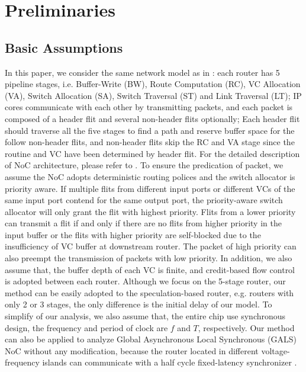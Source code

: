 \documentclass[10pt,journal]{IEEEtran}
\begin{document}
\section{Preliminaries}\label{model}
\subsection{Basic Assumptions}
In this paper, we consider the same network model as in \cite{627905}\cite{Shi:2008:RCA:1397757.1397996}\cite{707545}\cite{73}: each router has 5 pipeline stages, i.e. Buffer-Write (BW), Route Computation (RC), VC Allocation (VA), Switch Allocation (SA), Switch Traversal (ST) and Link Traversal (LT); IP cores communicate with each other by transmitting packets, and each packet is composed of a header flit and several non-header flits optionally; Each header flit should traverse all the five stages to find a path and reserve buffer space for the follow non-header flits, and non-header flits skip the RC and VA stage since the routine and VC have been determined by header flit. For the detailed description of NoC architecture, please refer to \cite{jerger2009chip}. To ensure the predication of packet, we assume the NoC adopts deterministic routing polices and the switch allocator is priority aware. If multiple flits from different input ports or different VCs of the same input port contend for the same output port, the priority-aware switch allocator will only grant the flit with highest priority. Flits from a lower priority can transmit a flit if and only if there are no flits from higher priority in the input buffer or the flits with higher priority are self-blocked due to the insufficiency of VC buffer at downstream router. The packet of high priority can also preempt the transmission of packets with low priority. In addition, we also assume that, the buffer depth of each VC is finite, and credit-based flow control is adopted between each router.
Although we focus on the 5-stage router, our method can be easily adopted to the speculation-based router, e.g. routers with only 2 or 3 stages, the only difference is the initial delay of our model. To simplify of our analysis, we also assume that, the entire chip use synchronous design, the frequency and period of clock are $f$ and $T$, respectively. Our method can also be applied to analyze Global Asynchronous Local Synchronous (GALS) NoC without any modification, because the router located in different voltage-frequency islands can communicate with a half cycle fixed-latency synchronizer \cite{5476986}.
\end{document}
